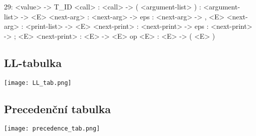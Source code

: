 \documentclass[11pt, titlepage, a4paper]{article}
\begin{document}
		29: <value> -> T\_ID <call> : <call> -> ( <argument-list> ) : <argument-list> -> <E> <next-arg> : <next-arg> -> eps : <next-arg> -> , <E> <next-arg> : <print-list> -> <E> <next-print> : <next-print> -> eps : <next-print> -> ; <E> <next-print>  : <E> -> <E> op <E> : <E> -> ( <E> ) \newline

		\subsection{LL-tabulka}
		\begin{center}
			\texttt{[image: LL\_tab.png]}
		\end{center}
		\subsection{Precedenční tabulka}
		\begin{center}
			\texttt{[image: precedence\_tab.png]}
		\end{center}
\end{document}
